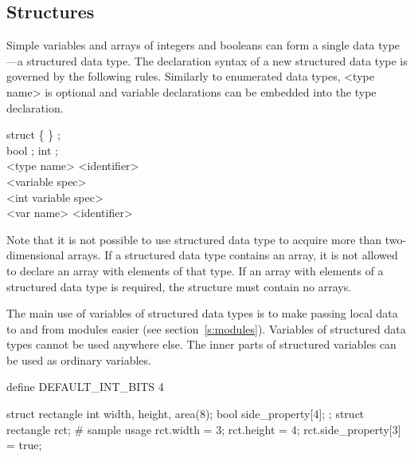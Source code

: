 \documentclass[a4paper,11pt,titlepage,english]{article}
\begin{document}
\subsection{Structures\label{s:data:struct}}

Simple variables and arrays of integers and booleans can form a single data
type---a structured data type. The declaration syntax of a new structured data
type is governed by the following rules. Similarly to enumerated data
types, <type name> is optional and variable declarations can be embedded
into the type declaration.

\begin{bnfgrammar}
 \is    struct  \{
                            \}  ;
                            \\
[struct member] \is bool  ;
    \or int  ;
    \\
<type name> \is <identifier> \\
<variable spec> \optional{[<dimen>]}\optional{[<dimen>]}\\
<int variable spec> \\
<var name> \is <identifier> \\
\end{bnfgrammar}

Note that it is not possible to use structured data type to acquire more
than two-dimensional arrays. If a structured data type contains an array,
it is not allowed to declare an array with elements of that type. If an
array with elements of a structured data type is required, the structure
must contain no arrays.

The main use of variables of structured data types is to make
passing local data to and from modules easier (see
section~\ref{s:modules}). Variables of structured data types cannot be used
anywhere else. The inner parts of structured variables can be used as
ordinary variables.

\begin{RemoplaSnippet}
    define DEFAULT_INT_BITS 4
    
    struct rectangle {
        int width, height, area(8);
        bool side_property[4];
    };
    struct rectangle rct;
    # sample usage
    rct.width = 3;
    rct.height = 4;
    rct.side_property[3] = true;
\end{RemoplaSnippet}
\end{document}
